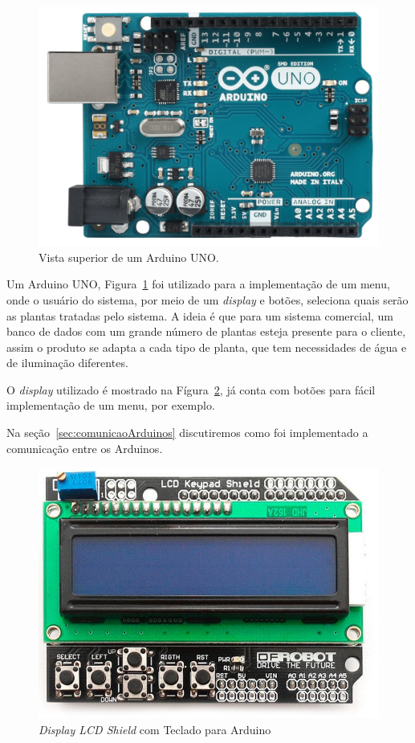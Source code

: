 \documentclass[a4paper,12pt]{report}
\begin{document}
			\begin{figure}[!h]
				\centering
				\includegraphics[width=0.5\linewidth]{figs/ARDUINO_UNO_A06}
				\caption{Vista superior de um Arduino UNO.}
				\label{fig:UNO}
			\end{figure}
		
			Um Arduino UNO, Figura~\ref{fig:UNO} foi utilizado para a implementação de um menu, onde o usuário do sistema, por meio de um \textit{display} e botões, seleciona quais serão as plantas tratadas pelo sistema. A ideia é que para um sistema comercial, um banco de dados com um grande número de plantas esteja presente para o cliente, assim o produto se adapta a cada tipo de planta, que tem necessidades de água e de iluminação diferentes. 
			
			O \textit{display} utilizado é mostrado na Fígura~\ref{fig:keyboard}, já conta com botões para fácil implementação de um menu, por exemplo.
			
		    Na seção~\ref{sec:comunicaoArduinos} discutiremos como foi implementado a comunicação entre os Arduinos. 	
			\begin{figure}[!h]
				\centering
				\includegraphics[width=0.7\linewidth]{figs/lcd-keyboard}
				\caption{\textit{Display LCD Shield} com Teclado para Arduino}
				\label{fig:keyboard}
			\end{figure}
			
			
		
\end{document}

